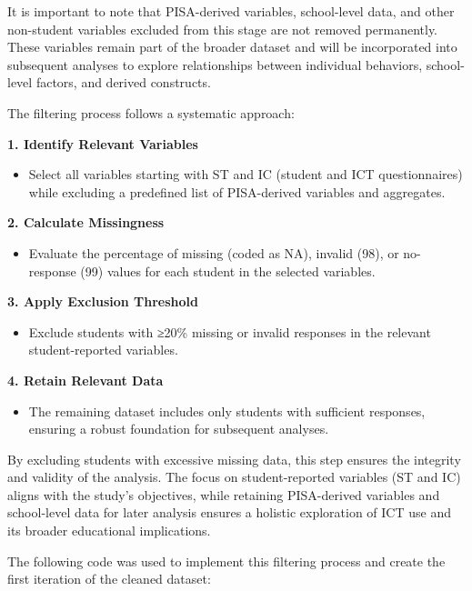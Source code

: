 \documentclass[
]{article}
\providecommand{\tightlist}{%
  \setlength{\itemsep}{0pt}\setlength{\parskip}{0pt}}
\begin{document}
It is important to note that PISA-derived variables, school-level data,
and other non-student variables excluded from this stage are not removed
permanently. These variables remain part of the broader dataset and will
be incorporated into subsequent analyses to explore relationships
between individual behaviors, school-level factors, and derived
constructs.

The filtering process follows a systematic approach:

\textbf{1. Identify Relevant Variables}

\begin{itemize}
\tightlist
\item
  Select all variables starting with ST and IC (student and ICT
  questionnaires) while excluding a predefined list of PISA-derived
  variables and aggregates.
\end{itemize}

\textbf{2. Calculate Missingness}

\begin{itemize}
\tightlist
\item
  Evaluate the percentage of missing (coded as NA), invalid (98), or
  no-response (99) values for each student in the selected variables.
\end{itemize}

\textbf{3. Apply Exclusion Threshold}

\begin{itemize}
\tightlist
\item
  Exclude students with ≥20\% missing or invalid responses in the
  relevant student-reported variables.
\end{itemize}

\textbf{4. Retain Relevant Data}

\begin{itemize}
\tightlist
\item
  The remaining dataset includes only students with sufficient
  responses, ensuring a robust foundation for subsequent analyses.
\end{itemize}

By excluding students with excessive missing data, this step ensures the
integrity and validity of the analysis. The focus on student-reported
variables (ST and IC) aligns with the study's objectives, while
retaining PISA-derived variables and school-level data for later
analysis ensures a holistic exploration of ICT use and its broader
educational implications.

The following code was used to implement this filtering process and
create the first iteration of the cleaned dataset:
\end{document}
